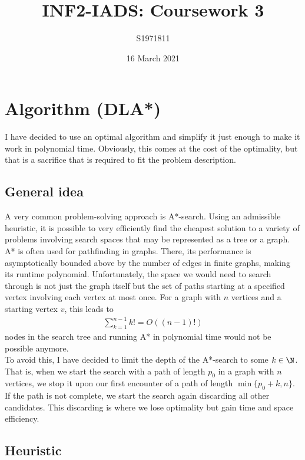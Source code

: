 \documentclass{article}
\title{INF2-IADS: Coursework 3}
\author{S1971811}
\date{16 March 2021}
\begin{document}
\maketitle

\section{Algorithm (DLA*)}

I have decided to use an optimal algorithm and simplify it just enough to make it
work in polynomial time. Obviously, this comes at the cost of the optimality, but
that is a sacrifice that is required to fit the problem description.

\subsection{General idea}

A very common problem-solving approach is A*-search. Using an admissible heuristic,
it is possible to very efficiently find the cheapest solution to a variety of problems
involving search spaces that may be represented as a tree or a graph.
A* is often used for pathfinding in graphs. There, its performance is asymptotically 
bounded above by the number of edges in finite graphs, making its runtime polynomial.
Unfortunately, the space we would need to search through is not just the graph itself
but the set of paths starting at a specified vertex involving each vertex at most once.
For a graph with $n$ vertices and a starting vertex $v$, this leads to
\begin{align*}
    \sum_{k=1}^{n-1} k! = O((n-1)!)
\end{align*}
nodes in the search tree and running A* in polynomial time would not be
possible anymore.\\
To avoid this, I have decided to limit the depth of the A*-search to some $k\in\N$.
That is, when we start the search with a path of length $p_0$ in a graph with $n$
vertices, we stop it upon our first encounter of a path of length $\min\{p_0+k, n\}$.
If the path is not complete, we start the search again discarding all other
candidates. This discarding is where we lose optimality but gain time and space
efficiency.

\subsection{Heuristic}
\end{document}
